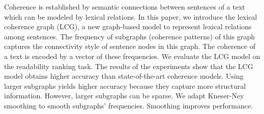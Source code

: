 Coherence is established by semantic connections between sentences of a text which can be modeled by lexical relations. In this paper, we introduce the lexical coherence graph (LCG), a new graph-based model to represent lexical relations among sentences. The frequency of subgraphs (coherence patterns) of this graph captures the connectivity style of sentence nodes in this graph. The coherence of a text is encoded by a vector of these frequencies. We evaluate the LCG model on the readability ranking task. The results of the experiments show that the LCG model obtains higher accuracy than state-of-the-art coherence models. Using larger subgraphs yields higher accuracy because they capture more structural information. However, larger subgraphs can be sparse. We adapt Kneser-Ney smoothing to smooth subgraphs' frequencies. Smoothing improves performance.

